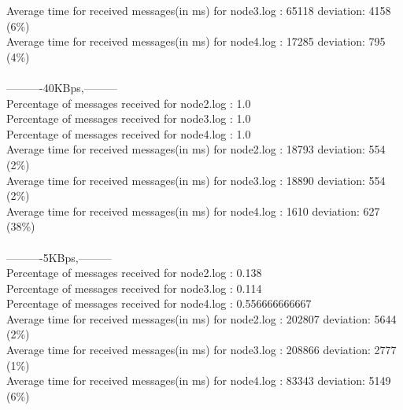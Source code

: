         Average time for received messages(in ms) for  node3.log : 65118 	deviation: 4158 (6\%)\\
        Average time for received messages(in ms) for  node4.log : 17285 	deviation: 795 (4\%)\\\\
        ----------40KBps,---------\\
        Percentage of messages received for node2.log : 1.0\\
        Percentage of messages received for node3.log : 1.0\\
        Percentage of messages received for node4.log : 1.0\\
        Average time for received messages(in ms) for  node2.log : 18793 	deviation: 554 (2\%)\\
        Average time for received messages(in ms) for  node3.log : 18890 	deviation: 554 (2\%)\\
        Average time for received messages(in ms) for  node4.log : 1610 	deviation: 627 (38\%)\\\\
        ----------5KBps,---------\\
        Percentage of messages received for node2.log : 0.138\\
        Percentage of messages received for node3.log : 0.114\\
        Percentage of messages received for node4.log : 0.556666666667\\
        Average time for received messages(in ms) for  node2.log : 202807 	deviation: 5644 (2\%)\\
        Average time for received messages(in ms) for  node3.log : 208866 	deviation: 2777 (1\%)\\
        Average time for received messages(in ms) for  node4.log : 83343 	deviation: 5149 (6\%)\\
